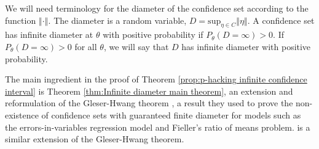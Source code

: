 \documentclass[twoside]{article}
\begin{document}
We will need terminology for the diameter of the confidence set according
to the function $\left\Vert \cdot\right\Vert $. The diameter is
a random variable, $D=\textrm{sup}_{\eta\in C}\left\Vert \eta\right\Vert $.
A confidence set has infinite diameter at $\theta$ with positive
probability if $P_{\theta}(D=\infty)>0$. If $P_{\theta}(D=\infty)>0$
for all $\theta$, we will say that $D$ has infinite diameter with
positive probability.

The main ingredient in the proof of Theorem \ref{prop:p-hacking infinite confidence interval}
is Theorem \ref{thm:Infinite diameter main theorem}, an extension
and reformulation of the Gleser-Hwang theorem \citep{gleser1987nonexistence},
a result they used to prove the non-existence of confidence sets with
guaranteed finite diameter for models such as the errors-in-variables
regression model and Fieller's ratio of means problem. \citet[theorem 1]{berger1999integrated}
is a similar extension of the Gleser-Hwang theorem.
\end{document}
